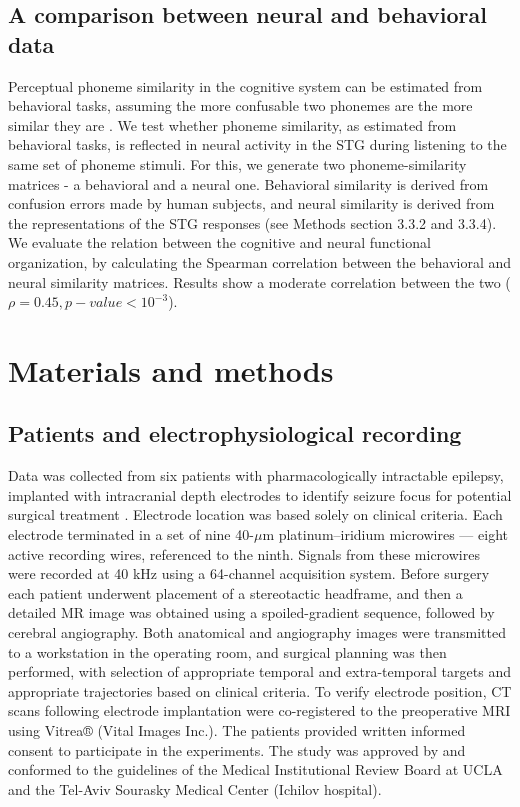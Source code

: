 \subsection{A comparison between neural and behavioral data}
Perceptual phoneme similarity in the cognitive system can be estimated from behavioral tasks, assuming the more confusable two phonemes are the more similar they are \citep{Tversky1977, Shepard1987}. We test whether phoneme similarity, as estimated from behavioral tasks, is reflected in neural activity in the STG during listening to the same set of phoneme stimuli. For this, we generate two phoneme-similarity matrices - a behavioral and a neural one. Behavioral similarity is derived from confusion errors made by human subjects, and neural similarity is derived from the representations of the STG responses (see Methods section 3.3.2 and 3.3.4). We evaluate the relation between the cognitive and neural functional organization, by calculating the Spearman correlation between the behavioral and neural similarity matrices. Results show a moderate correlation between the two ($\rho = 0.45, p-value < 10^{-3}$).

\section{Materials and methods}
\subsection{Patients and electrophysiological recording}
Data was collected from six patients with pharmacologically intractable epilepsy, implanted with intracranial depth electrodes to identify seizure focus for potential surgical treatment \citep{mukamel2012human}. Electrode location was based solely on clinical criteria. Each electrode terminated in a set of nine 40-$\mu$m platinum–iridium microwires \citep{fried1999cerebral} — eight active recording wires, referenced to the ninth. Signals from these microwires were recorded at 40 kHz using a 64-channel acquisition system. Before surgery each patient underwent placement of a stereotactic headframe, and then a detailed MR image was obtained using a spoiled-gradient sequence, followed by cerebral angiography. Both anatomical and angiography images were transmitted to a workstation in the operating room, and surgical planning was then performed, with selection of appropriate temporal and extra-temporal targets and appropriate trajectories based on clinical criteria. To verify electrode position, CT scans following electrode implantation were co-registered to the preoperative MRI using Vitrea® (Vital Images Inc.). The patients provided written informed consent to participate in the experiments. The study was approved by and conformed to the guidelines of the Medical Institutional Review Board at UCLA and the Tel-Aviv Sourasky Medical Center (Ichilov hospital).

